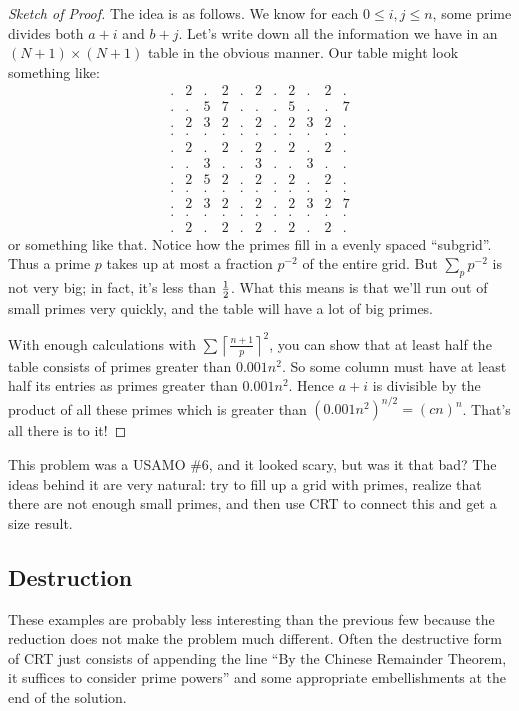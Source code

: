 \documentclass[11pt]{scrartcl}
\begin{document}
\begin{proof}
  [Sketch of Proof]
  The idea is as follows.
  We know for each $0 \le i,j \le n$, some prime divides both $a+i$ and $b+j$.
  Let's write down all the information we have in an $(N+1) \times (N+1)$ table in the obvious manner.
  Our table might look something like:
  \[
    \begin{array}{ccccccccccc}
      . & 2 & . & 2 & . & 2 & . & 2 & . & 2 & . \\
      . & . & 5 & 7 & . & . & . & 5 & . & . & 7 \\
      . & 2 & 3 & 2 & . & 2 & . & 2 & 3 & 2 & . \\
      . & . & . & . & . & . & . & . & . & . & . \\
      . & 2 & . & 2 & . & 2 & . & 2 & . & 2 & . \\
      . & . & 3 & . & . & 3 & . & . & 3 & . & . \\
      . & 2 & 5 & 2 & . & 2 & . & 2 & . & 2 & . \\
      . & . & . & . & . & . & . & . & . & . & . \\
      . & 2 & 3 & 2 & . & 2 & . & 2 & 3 & 2 & 7 \\
      . & . & . & . & . & . & . & . & . & . & . \\
      . & 2 & . & 2 & . & 2 & . & 2 & . & 2 & .
    \end{array}
  \]
  or something like that. Notice how the primes fill in a evenly spaced ``subgrid''.
  Thus a prime $p$ takes up at most a fraction $p^{-2}$ of the entire grid.
  But $\sum_p p^{-2}$ is not very big; in fact, it's less than $\frac{1}{2}$.
  What this means is that we'll run out of small primes very quickly,
  and the table will have a lot of big primes.

  With enough calculations with $\sum \left\lceil \frac{n+1}{p} \right\rceil^2$,
  you can show that at least half the table
  consists of primes greater than $0.001n^2$.
  So some column must have at least half its entries
  as primes greater than $0.001n^2$.
  Hence $a+i$ is divisible by the product of all these primes
  which is greater than $(0.001n^2)^{n/2} = (cn)^n$.
  That's all there is to it!
\end{proof}

This problem was a USAMO \#6, and it looked scary, but was it that bad?
The ideas behind it are very natural: try to fill up a grid with primes,
realize that there are not enough small primes, and then use CRT
to connect this and get a size result.

\subsection{Destruction}
These examples are probably less interesting than the previous few
because the reduction does not make the problem much different.
Often the destructive form of CRT just consists of appending the line
``By the Chinese Remainder Theorem, it suffices to consider prime powers''
and some appropriate embellishments at the end of the solution.
\end{document}
